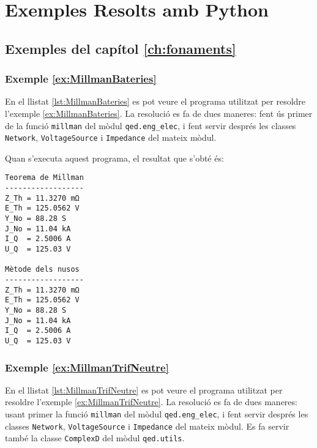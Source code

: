 \chapter{Exemples Resolts amb Python}\label{chap:python-exemples}


\section{Exemples del capítol \ref*{ch:fonaments}}

\hypertarget{exemple:MillmanBateries}{\subsection{Exemple \ref*{ex:MillmanBateries} \MillmanBateries}}

En el llistat \vref{lst:MillmanBateries} es pot veure el programa utilitzat per resoldre l'exemple \vref{ex:MillmanBateries}. La resolució es fa de dues maneres: fent ús primer de la funció \texttt{millman} del mòdul \texttt{qed.eng\_elec}, i fent servir després les classes \texttt{Network}, \texttt{VoltageSource} i \texttt{Impedance}  del mateix mòdul.


Quan s'executa aquest programa, el resultat que s'obté és:
\lstset{
	language=,
	numbers=none,
	frame=none
}
\begin{lstlisting}
Teorema de Millman
------------------
Z_Th = 11.3270 mΩ
E_Th = 125.0562 V
Y_No = 88.28 S
J_No = 11.04 kA
I_Q  = 2.5006 A
U_Q  = 125.03 V

Mètode dels nusos
------------------
Z_Th = 11.3270 mΩ
E_Th = 125.0562 V
Y_No = 88.28 S
J_No = 11.04 kA
I_Q  = 2.5006 A
U_Q  = 125.03 V
\end{lstlisting} 


\hypertarget{exemple:MillmanTrifNeutre}{\subsection{Exemple \ref*{ex:MillmanTrifNeutre} \MillmanTrifNeutre}}

En el llistat \vref{lst:MillmanTrifNeutre} es pot veure el programa utilitzat per resoldre l'exemple \vref{ex:MillmanTrifNeutre}. La resolució es fa de dues maneres: usant primer la funció \texttt{millman} del mòdul \texttt{qed.eng\_elec}, i fent servir després les classes \texttt{Network}, \texttt{VoltageSource} i \texttt{Impedance}  del mateix mòdul. Es fa servir també la classe \texttt{ComplexD} del mòdul \texttt{qed.utils}.


